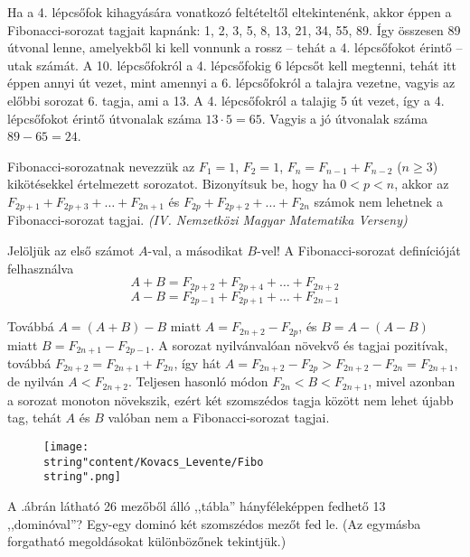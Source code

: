 \begin{solution}
Ha a 4. lépcsőfok kihagyására vonatkozó feltételtől eltekintenénk,
akkor éppen a Fibonacci-sorozat tagjait kapnánk: 1, 2, 3, 5, 8, 13,
21, 34, 55, 89. Így összesen 89 útvonal lenne, amelyekből ki kell
vonnunk a rossz -- tehát a 4. lépcsőfokot érintő -- utak számát.
A 10. lépcsőfokról a 4. lépcsőfokig 6 lépcsőt kell megtenni, tehát
itt éppen annyi út vezet, mint amennyi a 6. lépcsőfokról a talajra
vezetne, vagyis az előbbi sorozat 6. tagja, ami a 13. A 4. lépcsőfokról
a talajig 5 út vezet, így a 4. lépcsőfokot érintő útvonalak száma
$13\cdot5=65$. Vagyis a jó útvonalak száma $89-65=24$. 
\end{solution}
\begin{extraproblem}
Fibonacci-sorozatnak nevezzük az $F_{1}=1$, $F_{2}=1$, $F_{n}=F_{n-1}+F_{n-2}$
($n\ge3$) kikötésekkel értelmezett sorozatot. Bizonyítsuk be, hogy
ha $0<p<n$, akkor az $F_{2p+1}+F_{2p+3}+\ldots+F_{2n+1}$ és $F_{2p}+F_{2p+2}+\ldots+F_{2n}$
számok nem lehetnek a Fibonacci-sorozat tagjai.\emph{ (IV. Nemzetközi
Magyar Matematika Verseny) }
\end{extraproblem}

\begin{solution}
Jelöljük az első számot $A$-val, a másodikat $B$-vel! A Fibonacci-sorozat
definícióját felhasználva 
\[
A+B=F_{2p+2}+F_{2p+4}+\ldots+F_{2n+2}
\]
\[
A-B=F_{2p-1}+F_{2p+1}+\ldots+F_{2n-1}
\]

Továbbá $A=(A+B)-B$ miatt $A=F_{2n+2}-F_{2p}$, és $B=A-(A-B)$ miatt
$B=F_{2n+1}-F_{2p-1}$. A sorozat nyilvánvalóan növekvő és tagjai
pozitívak, továbbá $F_{2n+2}=F_{2n+1}+F_{2n}$, így hát $A=F_{2n+2}-F_{2p}>F_{2n+2}-F_{2n}=F_{2n+1}$,
de nyilván $A<F_{2n+2}$. Teljesen hasonló módon $F_{2n}<B<F_{2n+1}$,
mivel azonban a sorozat monoton növekszik, ezért két szomszédos tagja
között nem lehet újabb tag, tehát $A$ és $B$ valóban nem a Fibonacci-sorozat
tagjai. 
\end{solution}
\begin{figure}
\centering \texttt{[image: \\string"content/Kovacs\_Levente/Fibo\\string".png]}
\label{Fibo} \caption{}
\end{figure}

\begin{extraproblem}
A .ábrán látható 26 mezőből álló ,,tábla'' hányféleképpen
fedhető 13 ,,dominóval''? Egy-egy dominó két szomszédos mezőt fed
le. (Az egymásba forgatható megoldásokat különbözőnek tekintjük.) 
\end{extraproblem}

